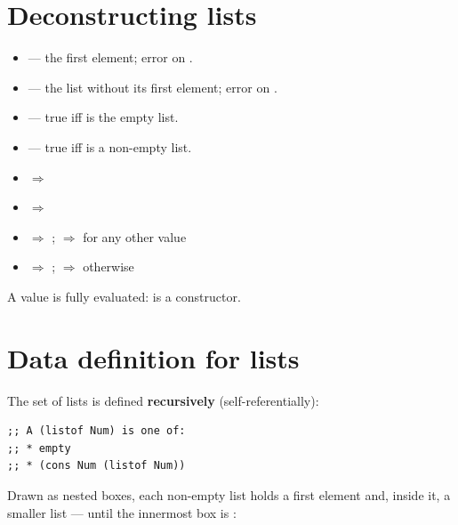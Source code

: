\section{Deconstructing lists}
\begin{itemize}
  \item {} --- the first element; error on .
  \item {} --- the list without its first element; error on .
  \item {} --- true iff  is the empty list.
  \item {} --- true iff  is a non-empty list.
\end{itemize}

\begin{important}
\begin{itemize}
  \item {} $\Rightarrow$ 
  \item {} $\Rightarrow$ 
  \item {} $\Rightarrow$ ;  $\Rightarrow$  for any other value
  \item {} $\Rightarrow$ ;  $\Rightarrow$  otherwise
\end{itemize}
A value  is fully evaluated:  is a constructor.
\end{important}

\section{Data definition for lists}

The set of lists is defined \textbf{recursively} (self-referentially):

\begin{lstlisting}[style=racket]
;; A (listof Num) is one of:
;; * empty
;; * (cons Num (listof Num))
\end{lstlisting}

Drawn as nested boxes, each non-empty list holds a first element and,
inside it, a smaller list --- until the innermost box is :

